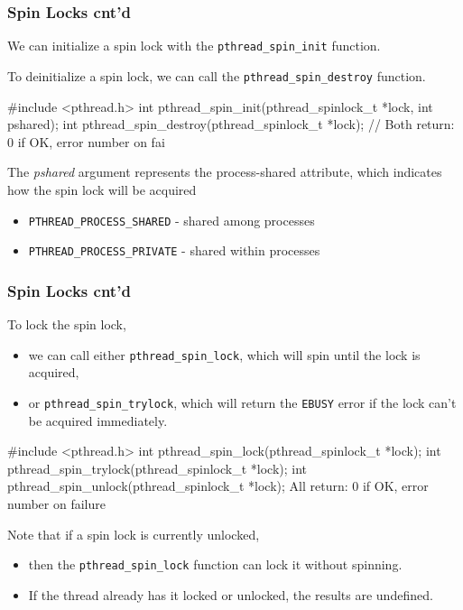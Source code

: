 \documentclass[newPxFont,sthlmFooter,nooffset]{beamer}
\begin{document}
\begin{frame}[t, fragile]
  \frametitle{Spin Locks cnt'd}
We can initialize a spin lock with the \texttt{pthread\_spin\_init} function. 

To deinitialize a spin lock, we can call the \texttt{pthread\_spin\_destroy} function.

\begin{codedef}
#include <pthread.h>
int pthread_spin_init(pthread_spinlock_t *lock, int pshared); 
int pthread_spin_destroy(pthread_spinlock_t *lock);
// Both return: 0 if OK, error number on fai
\end{codedef}

The \textit{pshared} argument represents the process-shared attribute, which indicates how the spin lock will be acquired
\begin{itemize}
\item \texttt{PTHREAD\_PROCESS\_SHARED} - shared among processes
\item  \texttt{PTHREAD\_PROCESS\_PRIVATE} - shared within processes
\end{itemize}
\end{frame}

\begin{frame}[t, fragile]
  \frametitle{Spin Locks cnt'd}

To lock the spin lock,
\begin{itemize}
\item we can call either \texttt{pthread\_spin\_lock}, which will spin
  until the lock is acquired,
\item or \texttt{pthread\_spin\_trylock}, which will return the
  \texttt{EBUSY} error if the lock can’t be acquired immediately.
\end{itemize}

  \begin{codedef}
#include <pthread.h>
int pthread_spin_lock(pthread_spinlock_t *lock); 
int pthread_spin_trylock(pthread_spinlock_t *lock); 
int pthread_spin_unlock(pthread_spinlock_t *lock);
All return: 0 if OK, error number on failure
  \end{codedef}

Note that if a spin lock is currently unlocked,
\begin{itemize}
\item then the \texttt{pthread\_spin\_lock} function can lock it without
  spinning.
\item If the thread already has it locked or unlocked, the results are undefined.
\end{itemize}

\end{frame}
\end{document}
